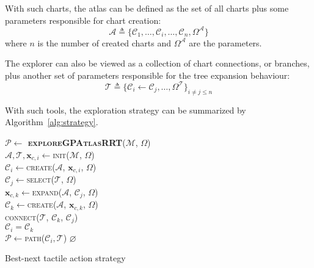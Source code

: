 With such charts, the atlas can be defined as the set of all charts plus some parameters
responsible for chart creation:
$$
\mathcal{A} \triangleq \{\mathcal{C}_1, \ldots, \mathcal{C}_i, \ldots, \mathcal{C}_n, \Omega^{\mathcal{A}}\}
$$
where $n$ is the number of created charts and $\Omega^{\mathcal{A}}$ are the parameters.

The explorer can also be viewed as a collection of chart connections, or branches,
plus another set of parameters responsible for the tree expansion behaviour:
$$
\mathcal{T} \triangleq \{\mathcal{C}_i \leftarrow \mathcal{C}_j, \ldots, \Omega^{\mathcal{T}}\}_{i \neq j \le n}
$$

With such tools, the exploration strategy can be summarized by Algorithm~\ref{alg:strategy}.
\begin{algorithm}[h]
    \textbf{$\mathcal{P} \leftarrow$ \textsc{exploreGPAtlasRRT}}($\mathcal{M}$, $\Omega$)\\ %
\LinesNumbered
\DontPrintSemicolon
\SetAlgoVlined {} 
$\mathcal{A}, \mathcal{T}, \mathbf{x}_{c,i} \leftarrow$\textsc{init}($\mathcal{M}$, $\Omega$) \\
$\mathcal{C}_{i} \leftarrow$\textsc{create}($\mathcal{A}$, $\mathbf{x}_{c,i}$, $\Omega$)\\
  {
    $\mathcal{C}_{j} \leftarrow$\textsc{select}($\mathcal{T}$, $\Omega$) \\
    $\mathbf{x}_{c,k} \leftarrow$\textsc{expand}($\mathcal{A}$, $\mathcal{C}_{j}$, $\Omega$) \\ 
    $\mathcal{C}_{k} \leftarrow$\textsc{create}($\mathcal{A}$, $\mathbf{x}_{c,k}$, $\Omega$) \\ 
    \textsc{connect}($\mathcal{T}$, $\mathcal{C}_{k}$, $\mathcal{C}_{j}$) \\
    $\mathcal{C}_{i} = \mathcal{C}_{k}$ \\
  }
  {\Return $\mathcal{P} \leftarrow$\textsc{path}($\mathcal{C}_{i}, \mathcal{T}$)}
  {\Return $\varnothing$}
  \caption{Best-next tactile action strategy} \label{alg:strategy}
\end{algorithm}

